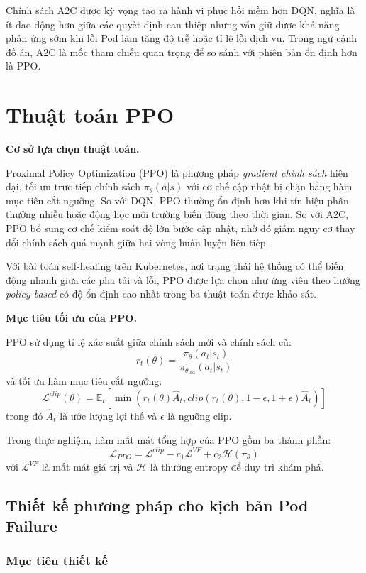 \noindent Chính sách A2C được kỳ vọng tạo ra hành vi phục hồi mềm hơn DQN, nghĩa là ít dao động hơn giữa các quyết định can thiệp nhưng vẫn giữ được khả năng phản ứng sớm khi lỗi Pod làm tăng độ trễ hoặc tỉ lệ lỗi dịch vụ. Trong ngữ cảnh đồ án, A2C là mốc tham chiếu quan trọng để so sánh với phiên bản ổn định hơn là PPO.

\section{Thuật toán PPO}

\noindent \textbf{Cơ sở lựa chọn thuật toán.}

\noindent Proximal Policy Optimization (PPO) là phương pháp \textit{gradient chính sách} hiện đại, tối ưu trực tiếp chính sách $\pi_\theta(a|s)$ với cơ chế cập nhật bị chặn bằng hàm mục tiêu cắt ngưỡng. So với DQN, PPO thường ổn định hơn khi tín hiệu phần thưởng nhiễu hoặc động học môi trường biến động theo thời gian. So với A2C, PPO bổ sung cơ chế kiểm soát độ lớn bước cập nhật, nhờ đó giảm nguy cơ thay đổi chính sách quá mạnh giữa hai vòng huấn luyện liên tiếp.

\noindent Với bài toán self-healing trên Kubernetes, nơi trạng thái hệ thống có thể biến động nhanh giữa các pha tải và lỗi, PPO được lựa chọn như ứng viên theo hướng \textit{policy-based} có độ ổn định cao nhất trong ba thuật toán được khảo sát.

\noindent \textbf{Mục tiêu tối ưu của PPO.}

\noindent PPO sử dụng tỉ lệ xác suất giữa chính sách mới và chính sách cũ:
\[
r_t(\theta) = \frac{\pi_\theta(a_t|s_t)}{\pi_{\theta_{\text{old}}}(a_t|s_t)}
\]
và tối ưu hàm mục tiêu cắt ngưỡng:
\[
\mathcal{L}^{clip}(\theta)=
\mathbb{E}_t
\left[
\min\left(
 r_t(\theta)\hat{A}_t,
 clip(r_t(\theta),1-\epsilon,1+\epsilon)\hat{A}_t
\right)
\right]
\]
trong đó $\hat{A}_t$ là ước lượng lợi thế và $\epsilon$ là ngưỡng clip.

\noindent Trong thực nghiệm, hàm mất mát tổng hợp của PPO gồm ba thành phần:
\[
\mathcal{L}_{PPO}
=
\mathcal{L}^{clip}
- c_1 \mathcal{L}^{VF}
+ c_2 \mathcal{H}(\pi_\theta)
\]
với $\mathcal{L}^{VF}$ là mất mát giá trị và $\mathcal{H}$ là thưởng entropy để duy trì khám phá.

\subsection{Thiết kế phương pháp cho kịch bản Pod Failure}

\subsubsection{Mục tiêu thiết kế}

